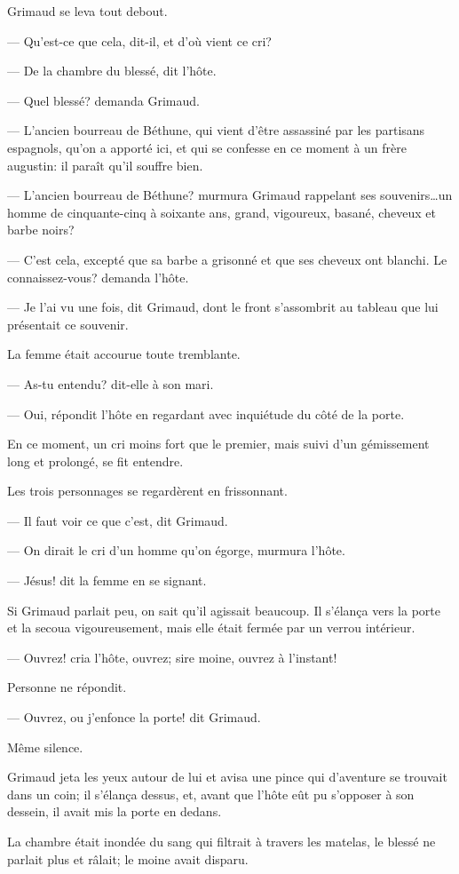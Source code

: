 Grimaud se leva tout debout.

— Qu'est-ce que cela, dit-il, et d'où vient ce cri?

— De la chambre du blessé, dit l'hôte.

— Quel blessé? demanda Grimaud.

— L'ancien bourreau de Béthune, qui vient d'être assassiné par les partisans espagnols, qu'on a apporté ici, et qui se confesse en ce moment à un frère augustin: il paraît qu'il souffre bien.

— L'ancien bourreau de Béthune? murmura Grimaud rappelant ses souvenirs\dots un homme de cinquante-cinq à soixante ans, grand, vigoureux, basané, cheveux et barbe noirs?

— C'est cela, excepté que sa barbe a grisonné et que ses cheveux ont blanchi. Le connaissez-vous? demanda l'hôte.

— Je l'ai vu une fois, dit Grimaud, dont le front s'assombrit au tableau que lui présentait ce souvenir.

La femme était accourue toute tremblante.

— As-tu entendu? dit-elle à son mari.

— Oui, répondit l'hôte en regardant avec inquiétude du côté de la porte.

En ce moment, un cri moins fort que le premier, mais suivi d'un gémissement long et prolongé, se fit entendre.

Les trois personnages se regardèrent en frissonnant.

— Il faut voir ce que c'est, dit Grimaud.

— On dirait le cri d'un homme qu'on égorge, murmura l'hôte.

— Jésus! dit la femme en se signant.

Si Grimaud parlait peu, on sait qu'il agissait beaucoup. Il s'élança vers la porte et la secoua vigoureusement, mais elle était fermée par un verrou intérieur.

— Ouvrez! cria l'hôte, ouvrez; sire moine, ouvrez à l'instant!

Personne ne répondit.

— Ouvrez, ou j'enfonce la porte! dit Grimaud.

Même silence.

Grimaud jeta les yeux autour de lui et avisa une pince qui d'aventure se trouvait dans un coin; il s'élança dessus, et, avant que l'hôte eût pu s'opposer à son dessein, il avait mis la porte en dedans.

La chambre était inondée du sang qui filtrait à travers les matelas, le blessé ne parlait plus et râlait; le moine avait disparu.

